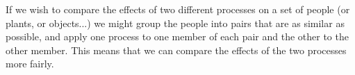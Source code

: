 If we wish to compare the effects of two different processes on a set of
people (or plants, or objects...) we might group the people into pairs that are
as similar as possible, and apply one process to one member of each pair and 
the other to the other member. This means that we can compare the effects
of the two processes more fairly.